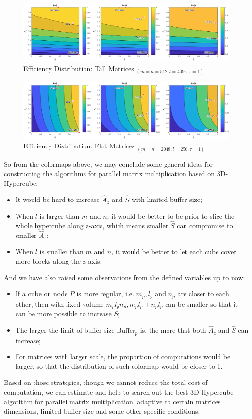 \documentclass{amsart}
\theoremstyle{definition}
\theoremstyle{remark}
\numberwithin{equation}{section}
\begin{document}
\begin{figure}[h]
	\includegraphics[scale=0.32]{Figures/Tall.png}
	\caption{Efficiency Distribution: Tall Matrices $_{(m=n=512,l=4096,\tau=1)}$}
\end{figure}
\begin{figure}[h]
	\includegraphics[scale=0.32]{Figures/Flat.png}
	\caption{Efficiency Distribution: Flat Matrices $_{(m=n=2048,l=256,\tau=1)}$}
\end{figure}
\par
So from the colormaps above, we may conclude some general ideas for constructing the algorithms for parallel matrix multiplication based on 3D-Hypercube:
\begin{itemize}
\item It would be hard to increase $\hat{A}_z$ and $\hat{S}$ with limited buffer size;
\item When $l$ is larger than $m$ and $n$, it would be better to be prior to slice the whole hypercube along z-axis, which means smaller $\hat{S}$ can compromise to smaller $\hat{A}_z$;
\item When $l$ is smaller than $m$ and $n$, it would be better to let each cube cover more blocks along the z-axis;\
\end{itemize}
\par
And we have also raised some observations from the defined variables up to now:
\begin{itemize}
\item If a cube on node $P$ is more regular, i.e. $m_p,l_p$ and $n_p$ are closer to each other, then with fixed volume $m_pl_pn_p, m_pl_p+n_pl_p$ can be smaller so that it can be more possible to increase $\hat{S}$;
\item The larger the limit of buffer size $\text{Buffer}_p$ is, the more that both $\hat{A}_z$ and $\hat{S}$ can increase;
\item For matrices with larger scale, the proportion of computations would be larger, so that the distribution of such colormap would be closer to 1.
\end{itemize}
\par
Based on those strategies, though we cannot reduce the total cost of computation, we can estimate and help to search out the best 3D-Hypercube algorithm for parallel matrix multiplication, adaptive to certain matrices dimensions, limited buffer size and some other specific conditions.\par
\end{document}
